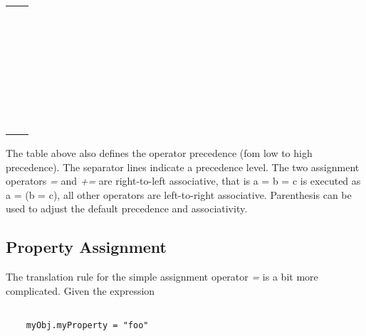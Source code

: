 \documentclass[a4paper,10pt]{scrreprt}
\begin{document}
\begin{tabular}{p{}p{}}

&
\\
&
\\
&
\\
&
\\
&
\\
&
\\
&
\\
&
\\
&
\\
&
\\
&
\\
&
\\
&
\\
&
\\
&
\\
&
\\
&
\\
&
\\
&
\\
&
\\
&
\\
&
\\
&
\\
&
\\
&
\\
&
\\
&
\\
&
\\
&
\\
&

\end{tabular}

		
The table above also defines the operator precedence (fom low to high precedence). The separator lines indicate a precedence level. 
The two assignment operators \emph{=} and \emph{+=} are right-to-left associative, that is a = b = c is executed as a = (b = c), all other
operators are left-to-right associative. Parenthesis can be used to adjust the default precedence and associativity. 

\subsection{ Property Assignment }
\label{propertyAssignment}

The translation rule for the simple assignment operator \emph{=} is a bit more complicated.
Given the expression 


\begin{lstlisting}

	myObj.myProperty = "foo"

\end{lstlisting}
\end{document}
